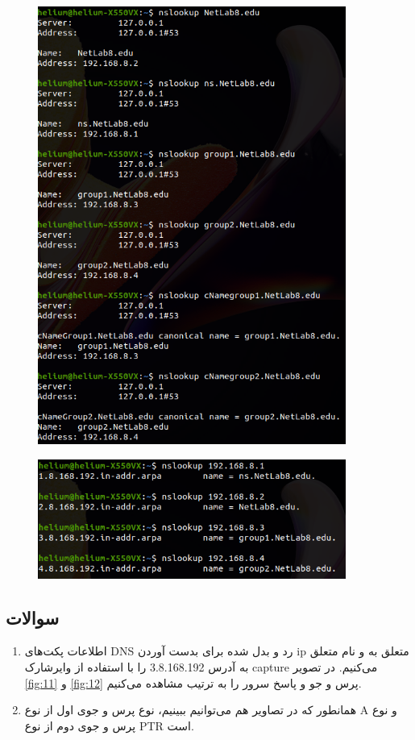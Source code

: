 \documentclass{article}
\begin{document}
\begin{figure}[h!]
	\centering
	\includegraphics[width=0.9\textwidth]{src/9.png}
	\caption{}
	\label{fig:9}
\end{figure}
\begin{figure}[h!]
	\centering
	\includegraphics[width=0.9\textwidth]{src/10.png}
	\caption{}
	\label{fig:10}
\end{figure}

\subsection{سوالات}
\begin{enumerate}
	\item 
	اطلاعات پکت‌های DNS رد و بدل شده برای بدست آوردن ip متعلق به  و نام متعلق به آدرس 3.8.168.192 را با استفاده از وایرشارک capture می‌کنیم. در تصویر \ref{fig:11} و \ref{fig:12} پرس‌ و جو و پاسخ سرور را به ترتیب مشاهده می‌کنیم.
	\item 
	همانطور که در تصاویر هم می‌توانیم ببینیم، نوع پرس و جوی اول از نوع A و نوع پرس و جوی دوم از نوع PTR است.
\end{enumerate}
\end{document}
